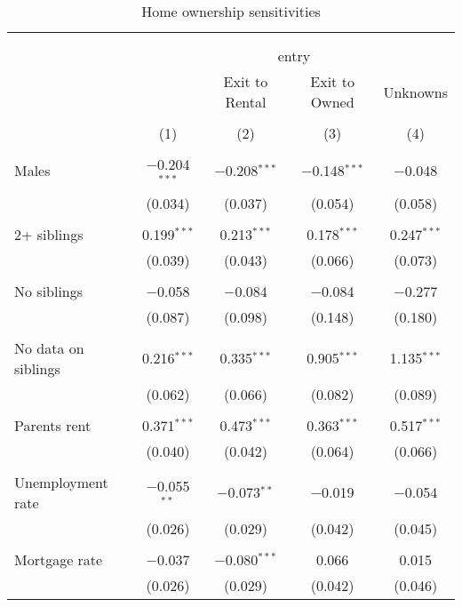 
\begin{table}[!htbp] \centering 
  \caption{Home ownership sensitivities} 
  \label{ModOwner} 
\begin{tabular}{@{\extracolsep{1pt}}lcccc} 
\\[-1.8ex]\hline 
\hline \\[-1.8ex] 
\\[-1.8ex] & \multicolumn{4}{c}{entry} \\ 
 &  & Exit to Rental & Exit to Owned & Unknowns \\ 
\\[-1.8ex] & (1) & (2) & (3) & (4)\\ 
\hline \\[-1.8ex] 
 Males & $-$0.204$^{***}$ & $-$0.208$^{***}$ & $-$0.148$^{***}$ & $-$0.048 \\ 
  & (0.034) & (0.037) & (0.054) & (0.058) \\ 
  & & & & \\ 
 2+ siblings & 0.199$^{***}$ & 0.213$^{***}$ & 0.178$^{***}$ & 0.247$^{***}$ \\ 
  & (0.039) & (0.043) & (0.066) & (0.073) \\ 
  & & & & \\ 
 No siblings & $-$0.058 & $-$0.084 & $-$0.084 & $-$0.277 \\ 
  & (0.087) & (0.098) & (0.148) & (0.180) \\ 
  & & & & \\ 
 No data on siblings & 0.216$^{***}$ & 0.335$^{***}$ & 0.905$^{***}$ & 1.135$^{***}$ \\ 
  & (0.062) & (0.066) & (0.082) & (0.089) \\ 
  & & & & \\ 
 Parents rent & 0.371$^{***}$ & 0.473$^{***}$ & 0.363$^{***}$ & 0.517$^{***}$ \\ 
  & (0.040) & (0.042) & (0.064) & (0.066) \\ 
  & & & & \\ 
 Unemployment rate & $-$0.055$^{**}$ & $-$0.073$^{**}$ & $-$0.019 & $-$0.054 \\ 
  & (0.026) & (0.029) & (0.042) & (0.045) \\ 
  & & & & \\ 
 Mortgage rate & $-$0.037 & $-$0.080$^{***}$ & 0.066 & 0.015 \\ 
  & (0.026) & (0.029) & (0.042) & (0.046) \\ 

\end{tabular}
\end{table}
